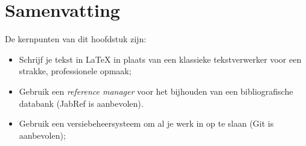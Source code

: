 \section{Samenvatting}
\label{sec:voorbereiding-samenvatting}

De kernpunten van dit hoofdstuk zijn:

\begin{itemize}
  \item Schrijf je tekst in {\LaTeX} in plaats van een klassieke tekstverwerker voor een strakke, professionele opmaak;
  \item Gebruik een \emph{reference manager} voor het bijhouden van een bibliografische databank (JabRef is aanbevolen).
  \item Gebruik een versiebeheersysteem om al je werk in op te slaan (Git is aanbevolen);
\end{itemize}
